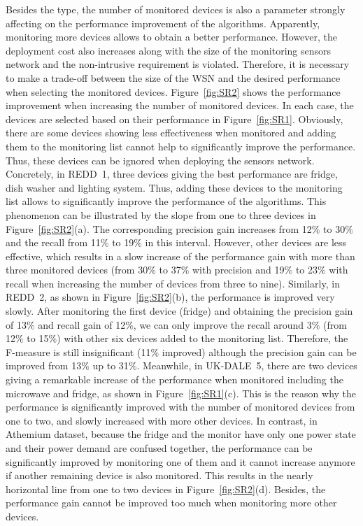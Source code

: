 Besides the type, the number of monitored devices is also a parameter strongly affecting on the performance improvement of the algorithms. Apparently, monitoring more devices allows to obtain a better performance. However, the deployment cost also increases along with the size of the monitoring sensors network and the non-intrusive requirement is violated. Therefore, it is necessary to make a trade-off between the size of the WSN and the desired performance when selecting the monitored devices. Figure~\ref{fig:SR2} shows the performance improvement when increasing the number of monitored devices. In each case, the devices are selected based on their performance in Figure~\ref{fig:SR1}. Obviously, there are some devices showing less effectiveness when monitored and adding them to the monitoring list cannot help to significantly improve the performance. Thus, these devices can be ignored when deploying the sensors network. 
Concretely, in REDD~1, three devices giving the best performance are fridge, dish washer and lighting system. Thus, adding these devices to the monitoring list allows to significantly improve the performance of the algorithms. This phenomenon can be illustrated by the slope from one to three devices in Figure~\ref{fig:SR2}(a). The corresponding precision gain increases from 12$\%$ to 30$\%$ and the recall from 11$\%$ to 19$\%$ in this interval. However, other devices are less effective, which results in a slow increase of the performance gain with more than three monitored devices (from 30$\%$ to 37$\%$ with precision and 19$\%$ to 23$\%$ with recall when increasing the number of devices from three to nine).
Similarly, in REDD~2, as shown in Figure~\ref{fig:SR2}(b), the performance is improved very slowly. After monitoring the first device (fridge) and obtaining the precision gain of 13$\%$ and recall gain of 12$\%$, we can only improve the recall around 3$\%$ (from 12$\%$ to 15$\%$) with other six devices added to the monitoring list. Therefore, the F-measure is still insignificant (11$\%$ improved) although the precision gain can be improved from 13$\%$ up to 31$\%$.
Meanwhile, in UK-DALE~5, there are two devices giving a remarkable increase of the performance when monitored including the microwave and fridge, as shown in Figure~\ref{fig:SR1}(c). This is the reason why the performance is significantly improved with the number of monitored devices from one to two, and slowly increased with more other devices.
In contrast, in Athemium dataset, because the fridge and the monitor have only one power state and their power demand are confused together, the performance can be significantly improved by monitoring one of them and it cannot increase anymore if another remaining device is also monitored. This results in the nearly horizontal line from one to two devices in Figure~\ref{fig:SR2}(d). Besides, the performance gain cannot be improved too much when monitoring more other devices.


